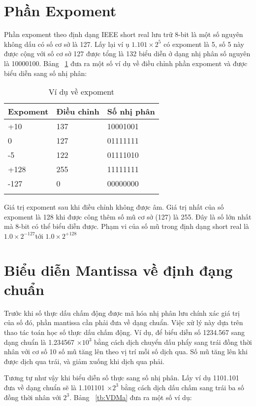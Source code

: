 	 \section*{Phần Expoment}
 Phần expoment theo định dạng IEEE short real lưu trữ 8-bit là một số nguyên không dấu có số cơ sở là 127. Lấy lại ví ụ $1.101 \times 2^5$ có expoment là 5, số 5 này được cộng với số cơ sở 127 được tổng là 132 biểu diễn ở dạng nhị phân số nguyên là 10000100. Bảng ~\ref{tb:VDEx} đưa ra một số ví dụ về điều chỉnh phần expoment và được biểu diễn sang số nhị phân:
 	\begin{longtable}{|l|l|l|}
 		\hline
 			Expoment & Điều chỉnh & Số nhị phân \\
 		\hline
 		\hline
 			+10 & 137 & 10001001 \\
 		\hline
 			0 & 127 & 01111111 \\
 		\hline
 			-5 & 122 & 01111010 \\
 		\hline
 			+128 & 255 & 11111111 \\
 		\hline
 			-127 & 0 & 00000000 \\ 		
 		\hline
 			\caption{Ví dụ về expoment}
 			\label{tb:VDEx}
 	\end{longtable}
 	
 	Giá trị expoment sau khi điều chỉnh không được âm. Giá trị nhất của số expoment là 128 khi được công thêm số mũ cơ sở (127) là 255. Đây là số lớn nhất mà 8-bit có thể biểu diễn được. Phạm vi của số mũ trong định dạng short real là $1.0 \times 2^{-127} $tới $1.0 \times 2^{+128}$
 	
\section*{Biểu diễn Mantissa về định đạng chuẩn}
	Trước khi số thực dấu chấm động được mã hóa nhị phân lưu chính xác giá trị của số đó, phần mantissa cần phải đưa về dạng chuẩn. Việc xử lý này dựa trên thao tác toán học số thực dấu chấm động. Ví dụ, để biểu diễn số 1234.567 sang dạng chuẩn là 1.234567 $\times 10^3$ bằng cách dịch chuyển dấu phẩy sang trái đồng thời nhân với cơ số 10 số mũ tăng lên theo vị trí mỗi số dịch qua. Số mũ tăng lên khi được dịch qua trái, và giảm xuống khi dịch qua phải.
	
	Tương tự như vậy khi biểu diễn số thực sang số nhị phân. Lấy ví dụ 1101.101 đưa về dạng chuẩn sẽ là 1.101101 $\times 2^3$ bằng cách dịch dấu chấm sang trái ba số đồng thời nhân với  $2^3$. Bảng ~\ref{tb:VDMa} đưa ra một số ví dụ: \\ \\
	
